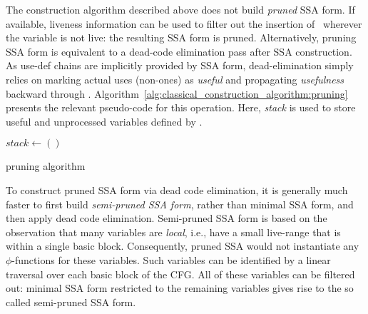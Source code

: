 {The construction algorithm described above does not build \emph{pruned} SSA form. 
If available, liveness information can be used to filter out the insertion of \phifuns\ wherever the variable is not live: 
the resulting SSA form is pruned. 
Alternatively, pruning SSA form is equivalent to a dead-code elimination pass after SSA construction. 
As use-def chains are implicitly provided by SSA form, dead-\phifun elimination simply relies on marking actual uses (non-\phifun ones) as \emph{useful} and propagating \emph{usefulness} backward through \phifuns. 
Algorithm~\ref{alg:classical_construction_algorithm:pruning} presents the relevant pseudo-code for this operation. 
Here, \textit{stack} is used to store useful and unprocessed variables defined by \phifuns.

\begin{algorithm}[h]
$\textit{stack} \leftarrow ()$\;
\caption{\phifun pruning algorithm}
\label{alg:classical_construction_algorithm:pruning}
\end{algorithm}

To construct pruned SSA form via dead code elimination, it is generally much faster to first build \emph{semi-pruned SSA form}, rather than minimal SSA form, and then apply dead code elimination. 
Semi-pruned SSA form is based on the observation that many variables are \emph{local}, i.e., have a small live-range that is within a single basic block. 
Consequently, pruned SSA would not instantiate any $\phi$-functions for these variables. 
Such variables can be identified by a linear traversal over each basic block of the CFG. 
All of these variables can be filtered out: 
minimal SSA form restricted to the remaining variables gives rise to the so called semi-pruned SSA form.




}
